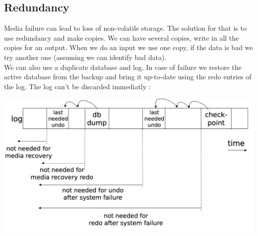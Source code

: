 \documentclass[12pt,a4paper]{article}
\begin{document}
\subsection{Redundancy}
Media failure can lead to loss of non-volatile storage. The solution for that is to use redundancy and make copies. We can have several copies, write in all the copies for an output. When we do an input we use one copy, if the data is bad we try another one (assuming we can identify bad data).\\
We can also use a duplicate database and log. In case of failure we restore the active database from the backup and bring it up-to-date using the redo entries of the log. The log can't be discarded immediatly :
\begin{center}
\includegraphics[scale=0.2]{img/img62.png}
\end{center}
\end{document}
